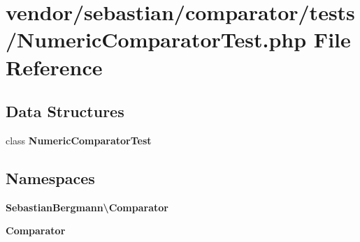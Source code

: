 \section{vendor/sebastian/comparator/tests/\+Numeric\+Comparator\+Test.php File Reference}
\label{_numeric_comparator_test_8php}
\subsection*{Data Structures}
\begin{DoxyCompactItemize}
\item 
class {\bf Numeric\+Comparator\+Test}
\end{DoxyCompactItemize}
\subsection*{Namespaces}
\begin{DoxyCompactItemize}
\item 
 {\bf Sebastian\+Bergmann\textbackslash{}\+Comparator}
\item 
 {\bf Comparator}
\end{DoxyCompactItemize}
